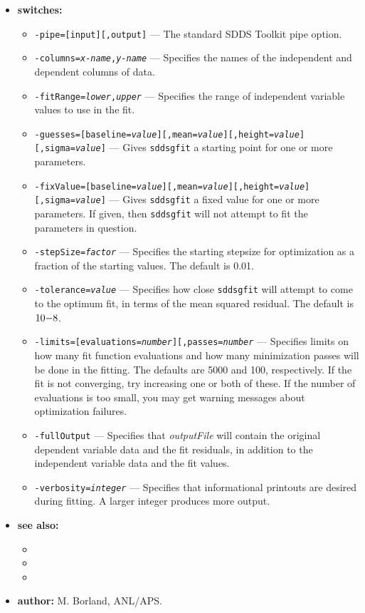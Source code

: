 \begin{itemize}
\item {\bf switches:}
    \begin{itemize}
    \item {\tt -pipe=[input][,output]} --- The standard SDDS Toolkit pipe option.
    \item {\tt -columns={\em x-name},{\em y-name}} 
        --- Specifies the names of the independent and dependent columns of data.
    \item {\tt -fitRange={\em lower},{\em upper}} --- Specifies the range of independent variable
        values to use in the fit.
    \item {\tt -guesses=[baseline={\em value}][,mean={\em value}][,height={\em value}][,sigma={\em value}]} 
        --- Gives {\tt sddsgfit} a starting point for one or more parameters.
    \item {\tt -fixValue=[baseline={\em value}][,mean={\em value}][,height={\em value}][,sigma={\em value}]} 
        --- Gives {\tt sddsgfit} a fixed value for one or more parameters.  If given, then {\tt sddsgfit}
        will not attempt to fit the parameters in question.
    \item {\tt -stepSize={\em factor}} --- Specifies the starting stepsize for optimization as a fraction
        of the starting values.  The default is 0.01.
    \item {\tt -tolerance={\em value}} --- Specifies how close {\tt sddsgfit} will attempt to come to the optimum fit,
        in terms of the mean squared residual.  The default is ${\rm 10 {-8}}$.
    \item {\tt -limits=[evaluations={\em number}][,passes={\em number}} ---
        Specifies limits on how many fit function evaluations and how many minimization passes will be done
        in the fitting.    The defaults are 5000 and 100, respectively.  If the fit is not converging,
        try increasing one or both of these.  If the number of evaluations is too small, you may get
        warning messages about optimization failures.
    \item {\tt -fullOutput} --- Specifies that {\em outputFile} will contain the original dependent variable
        data and the fit residuals, in addition to the independent variable data and the fit values.
    \item {\tt -verbosity={\em integer}} --- Specifies that informational printouts are desired during fitting.  A larger
        integer produces more output.
    \end{itemize}
\item {\bf see also:}
    \begin{itemize}
    \item {}
    \item {}
    \item {}
    \end{itemize}
\item {\bf author:} M. Borland, ANL/APS.
\end{itemize}



